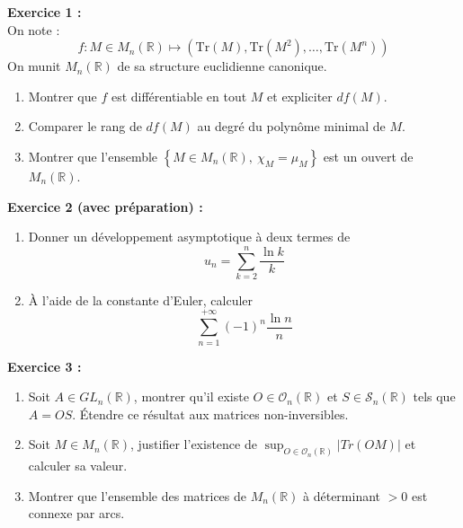 \documentclass[11pt,a4paper]{article}
\begin{document}
\textbf{Exercice 1 :} \\
On note : \[f : M\in M_n(\mathbb{R}) \mapsto (\text{Tr}(M),\text{Tr}(M^2),\dots,\text{Tr}(M^n))\]
On munit $ M_n(\mathbb{R})$ de sa structure euclidienne canonique.
\begin{enumerate}
\item Montrer que $f$ est différentiable en tout $M$ et expliciter $df(M)$.
\item Comparer le rang de $df(M)$ au degré du polynôme minimal de $M$.
\item Montrer que l'ensemble $\left \{ M \in M_n(\mathbb{R}), \ \chi_M = \mu_M \right \} $ est un ouvert de $M_n(\mathbb{R})$. \\
\end{enumerate}


\textbf{Exercice 2 (avec préparation) :} 
\begin{enumerate}
\item Donner un développement asymptotique à deux termes de 
\[u_n = \sum_{k=2}^n \frac{\ln{k}}{k}\]
\item À l'aide de la constante d'Euler, calculer 
\[\sum_{n=1}^{+\infty} (-1)^n\frac{\ln{n}}{n}\]
\end{enumerate}

\textbf{Exercice 3 :}
\begin{enumerate}
\item Soit $A\in GL_n(\mathbb{R})$, montrer qu'il existe $O\in \mathcal{O}_n(\mathbb{R})$ et $S \in \mathcal{S}_n(\mathbb{R})$ tels que $A=OS$. Étendre ce résultat aux matrices non-inversibles.
\item Soit $M\in M_n(\mathbb{R})$, justifier l'existence de $\displaystyle \sup_{O\in \mathcal{O}_n(\mathbb{R})} \left | Tr(OM) \right |$ et calculer sa valeur. \\
\item Montrer que l'ensemble des matrices de $M_n(\mathbb{R})$ à déterminant $> 0$ est connexe par arcs.
\end{enumerate}
~\\
\end{document}
